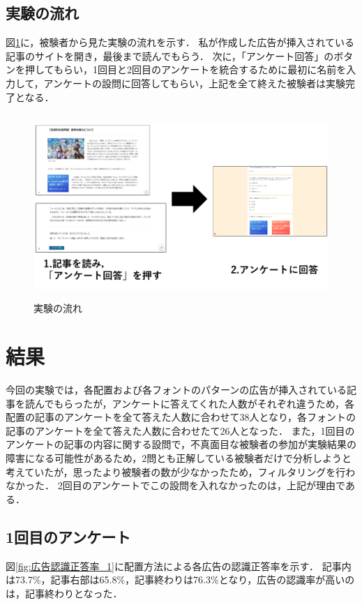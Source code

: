 \documentclass[12pt,a4j,titlepage]{ltjsarticle}
\begin{document}
\subsection{実験の流れ}
図\ref{fig:実験の流れ}に，被験者から見た実験の流れを示す．
私が作成した広告が挿入されている記事のサイトを開き，最後まで読んでもらう．
次に，「アンケート回答」のボタンを押してもらい，1回目と2回目のアンケートを統合するために最初に名前を入力して，アンケートの設問に回答してもらい，上記を全て終えた被験者は実験完了となる．

\begin{figure}[H]
\begin{center}
 \includegraphics[height=70mm]{figures/実験の流れ.pdf}
\end{center}
 \caption{実験の流れ}
 \label{fig:実験の流れ}
\end{figure}

\clearpage

\section{結果}
今回の実験では，各配置および各フォントのパターンの広告が挿入されている記事を読んでもらったが，アンケートに答えてくれた人数がそれぞれ違うため，各配置の記事のアンケートを全て答えた人数に合わせて38人となり，各フォントの記事のアンケートを全て答えた人数に合わせたて26人となった．
また，1回目のアンケートの記事の内容に関する設問で，不真面目な被験者の参加が実験結果の
障害になる可能性があるため，2問とも正解している被験者だけで分析しようと考えていたが，思ったより被験者の数が少なかったため，フィルタリングを行わなかった．
2回目のアンケートでこの設問を入れなかったのは，上記が理由である．

\subsection{1回目のアンケート}
図\ref{fig:広告認識正答率_1}に配置方法による各広告の認識正答率を示す．
記事内は73.7\%，記事右部は65.8\%，記事終わりは76.3\%となり，広告の認識率が高いのは，記事終わりとなった．
\end{document}
